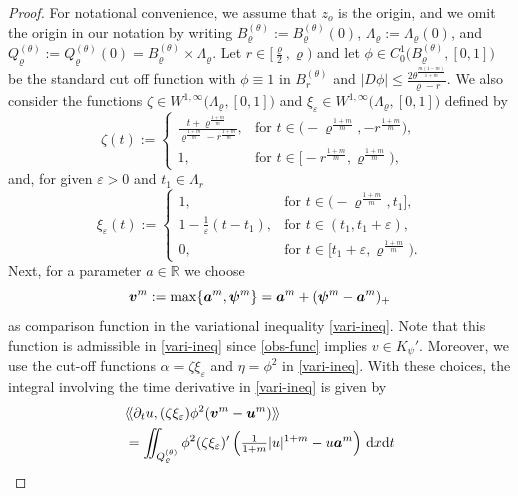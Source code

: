 \documentclass[a4paper, 10pt, american]{amsart}
\numberwithin{theorem}{section}
\numberwithin{equation}{section}
\def\R{\mathbb{R}}
\newcommand{\dxdt}{\,\mathrm{d}x\mathrm{d}t}
\renewcommand{\rho}{\varrho}
\newcommand{\power}[2]{\bm{#1^{\mbox{\unboldmath{\scriptsize$#2$}}}}}
\begin{document}
\begin{proof}
For notational convenience, we assume that $z_o$ is the origin, and we
omit the origin in our notation by writing $B_\rho^{(\theta)}:=B_\rho^{(\theta)}(0)$, $\Lambda_\rho:=\Lambda_\rho(0)$, and $Q_\rho^{(\theta)}:=Q_\rho^{(\theta)}(0)=B_\rho^{(\theta)}\times\Lambda_\rho$.
Let $r\in [\frac{\rho}2,\rho)$ and let
$\phi\in C^1_0\big(B^{(\theta)}_\rho,[0,1]\big)$ be the standard cut
off function with $\phi \equiv 1$ in $B_r^{(\theta)}$ and $|D\phi|\leq
\frac{2\theta^{\frac{m(1-m)}{1+m}}}{\rho-r}$. We also consider the functions
$\zeta \in W^{1,\infty} \big(\Lambda_\rho,[0,1]\big)$ and
$\xi_\varepsilon \in W^{1,\infty}\big (\Lambda_\rho,[0,1]\big)$
defined by 
\begin{equation*}
	\zeta(t)
	:=
	\left\{
	\begin{array}{cl}
	\frac{t + \rho^{\frac{1+m}{m}}}{\rho^{\frac{1+m}{m}}-r^{\frac{1+m}{m}}}, &
	\mbox{for $t\in \big(-\rho^{\frac{1+m}{m}},-r^{\frac{1+m}{m}}\big)$},\\[3pt]
	1 ,& \mbox{for $t\in \big[-r^{\frac{1+m}{m}},  \rho^{\frac{1+m}{m}}\big)$,}
	\end{array}
	\right.
\end{equation*}
and, for given $\varepsilon >0$ and $t_1 \in \Lambda_r$ 
$$
	\xi_\varepsilon(t) 
	:= 
	\left\{
	\begin{array}{cl}
	1 ,& \mbox{for $t\in \big(- \rho^{\frac{1+m}{m}}, t_1\big]$,} \\[3pt]
	1-\frac{1}{\varepsilon} (t-t_1) ,& 
	\mbox{for $t\in (t_1, t_1+\varepsilon)$,} \\[3pt]
	0 , & \mbox{for $t\in [t_1+\varepsilon,  \rho^{\frac{1+m}{m}} )$.} 
\end{array}
\right.
$$
Next, for a parameter $a\in\R$ we choose
$$
	\power{v}{m}
	:= 
	\max\{\power{a}{m}, \power{\psi}{m}\} = \power a m + (\power \psi m-\power a m)_+
$$
as comparison function in the variational inequality
\eqref{vari-ineq}. Note that this function is admissible in
\eqref{vari-ineq} since \eqref{obs-func} implies $v\in K_\psi'$. 
Moreover, we use the cut-off functions
$\alpha = \zeta\xi_{\varepsilon}$ and $\eta=\phi^2$ in
\eqref{vari-ineq}.
With these choices, the integral 
involving the time derivative in \eqref{vari-ineq} is given by
\begin{align}\label{10}\nonumber
&\langle\!\langle\partial_tu,(\zeta\xi_\varepsilon)\phi^2(\power vm- \power um)\rangle\!\rangle \\\nonumber
&=\iint_{Q_\rho^{(\theta)}} \phi^2 (\zeta\xi_\varepsilon)' \left( \tfrac1{1+m}|u|^{1+m} -u\power am \right) \dxdt \\

\end{align}
\end{proof}
\end{document}
